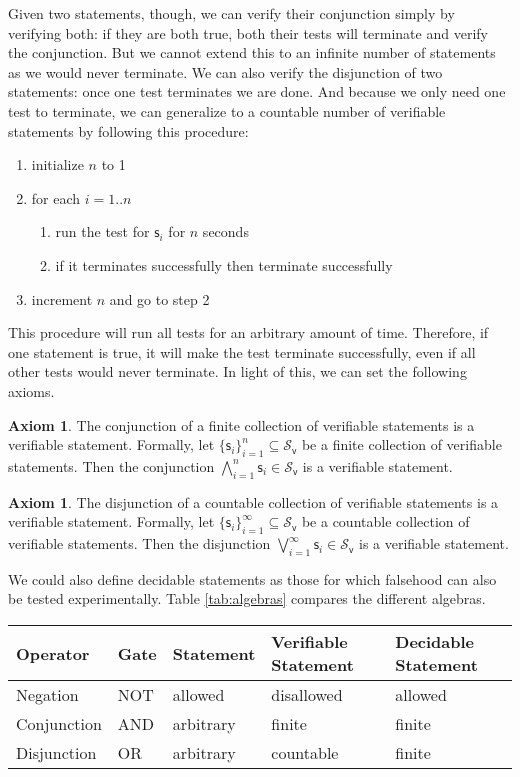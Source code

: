 \documentclass[%
reprint,
amsmath,amssymb,
aps,
prx,
]{revtex4-1}
\theoremstyle{plain}%
\theoremstyle{definition}
\newtheorem{axiom}[thrm]{Axiom}
\theoremstyle{remark}
\def\vstmtSet{\mathcal{S}_\textsf{v}}
\def\bigAND{\bigwedge}
\def\bigOR{\bigvee}
\newcommand{\stmt}[1][s] {\mathsf{#1}}
\begin{document}
Given two statements, though, we can verify their conjunction simply by verifying both: if they are both true, both their tests will terminate and verify the conjunction. But we cannot extend this to an infinite number of statements as we would never terminate. We can also verify the disjunction of two statements: once one test terminates we are done. And because we only need one test to terminate, we can generalize to a countable number of verifiable statements by following this procedure:
\begin{enumerate}
	\item initialize $n$ to 1
	\item for each $i=1..n$
	\begin{enumerate}
		\item run the test for $\stmt_i$ for $n$ seconds
		\item if it terminates successfully then terminate successfully
	\end{enumerate}
	\item increment $n$ and go to step 2
\end{enumerate}
This procedure will run all tests for an arbitrary amount of time. Therefore, if one statement is true, it will make the test terminate successfully, even if all other tests would never terminate. In light of this, we can set the following axioms.

\begin{axiom}\label{ax_verifiable_AND}
	The conjunction of a finite collection of verifiable statements is a verifiable statement. Formally, let $\{\stmt_i\}_{i=1}^{n} \subseteq \vstmtSet$ be a finite collection of verifiable statements. Then the conjunction $\bigAND\limits_{i=1}^{n} \stmt_i \in \vstmtSet$ is a verifiable statement.
\end{axiom}
	\begin{axiom}\label{ax_verifiable_OR}
	The disjunction of a countable collection of verifiable statements is a verifiable statement. Formally, let $\{\stmt_i\}_{i=1}^{\infty} \subseteq \vstmtSet$ be a countable collection of verifiable statements. Then the disjunction $\bigOR\limits_{i=1}^{\infty} \stmt_i \in \vstmtSet$ is a verifiable statement.
\end{axiom}

We could also define decidable statements as those for which falsehood can also be tested experimentally. Table \ref{tab:algebras} compares the different algebras.

\begin{table*}
	\centering
	\begin{tabular}{p{} p{} p{} p{} p{}}
		Operator & Gate & Statement & Verifiable Statement & Decidable Statement  \\ 
		\hline 
		Negation & NOT & allowed & disallowed & allowed \\ 
		Conjunction & AND & arbitrary  & finite & finite \\ 
		Disjunction & OR & arbitrary  & countable & finite \\ 
	\end{tabular}
	\caption{Comparing algebras of statements.}\label{tab:algebras}
\end{table*}
\end{document}
